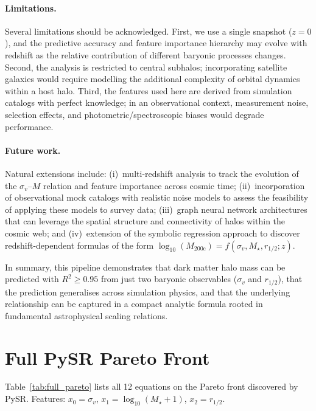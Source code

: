 \documentclass[12pt, a4paper]{article}
\newcommand{\logMhalo}{\log_{10}(M_{200\mathrm{c}})}
\newcommand{\sigmav}{\sigma_v}
\newcommand{\Mstar}{M_\star}
\begin{document}
\paragraph{Limitations.}
Several limitations should be acknowledged.  First, we use a single snapshot ($z = 0$), and the predictive accuracy and feature importance hierarchy may evolve with redshift as the relative contribution of different baryonic processes changes.  Second, the analysis is restricted to central subhalos; incorporating satellite galaxies would require modelling the additional complexity of orbital dynamics within a host halo.  Third, the features used here are derived from simulation catalogs with perfect knowledge; in an observational context, measurement noise, selection effects, and photometric/spectroscopic biases would degrade performance.

\paragraph{Future work.}
Natural extensions include: (i)~multi-redshift analysis to track the evolution of the $\sigmav$--$M$ relation and feature importance across cosmic time; (ii)~incorporation of observational mock catalogs with realistic noise models to assess the feasibility of applying these models to survey data; (iii)~graph neural network architectures that can leverage the spatial structure and connectivity of halos within the cosmic web; and (iv)~extension of the symbolic regression approach to discover redshift-dependent formulas of the form $\logMhalo = f(\sigmav, \Mstar, r_{1/2}; z)$.

\bigskip
\noindent
In summary, this pipeline demonstrates that dark matter halo mass can be predicted with $R^2 \geq 0.95$ from just two baryonic observables ($\sigmav$ and $r_{1/2}$), that the prediction generalises across simulation physics, and that the underlying relationship can be captured in a compact analytic formula rooted in fundamental astrophysical scaling relations.


\appendix

\section{Full PySR Pareto Front}
\label{app:pareto}

Table~\ref{tab:full_pareto} lists all 12 equations on the Pareto front discovered by PySR.  Features: $x_0 = \sigmav$, $x_1 = \log_{10}(\Mstar + 1)$, $x_2 = r_{1/2}$.
\end{document}
